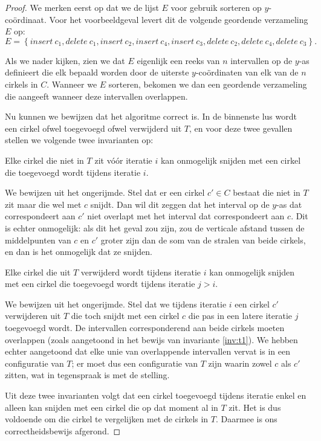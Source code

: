 \begin{proof}
We merken eerst op dat we de lijst $E$ voor gebruik sorteren op
$y$-co\"ordinaat. Voor het voorbeeldgeval levert dit de volgende
geordende verzameling $E$ op: \[E = \left\{insert\ c_1, delete\ c_1,
insert\ c_2, insert\ c_4, insert\ c_3, delete\ c_2, delete\ c_4,
delete\ c_3 \right\}.\]

Als we nader kijken, zien we dat $E$ eigenlijk een reeks van $n$
intervallen op de $y$-as definieert die elk bepaald worden door de
uiterste $y$-co\"ordinaten van elk van de $n$ cirkels in $C$. Wanneer
we $E$ sorteren, bekomen we dan een geordende verzameling die aangeeft
wanneer deze intervallen overlappen.

Nu kunnen we bewijzen dat het algoritme correct is. In de binnenste
lus wordt een cirkel ofwel toegevoegd ofwel verwijderd uit $T$, en
voor deze twee gevallen stellen we volgende twee invarianten op:

\begin{inv}
Elke cirkel die niet in $T$ zit v\'o\'or iteratie $i$ kan onmogelijk
snijden met een cirkel die toegevoegd wordt tijdens iteratie $i$.
\label{inv:t1}
\end{inv}

We bewijzen uit het ongerijmde. Stel dat er een cirkel $c' \in C$
bestaat die niet in $T$ zit maar die wel met $c$ snijdt. Dan wil dit
zeggen dat het interval op de $y$-as dat correspondeert aan $c'$ niet
overlapt met het interval dat correspondeert aan $c$. Dit is echter
onmogelijk: als dit het geval zou zijn, zou de verticale afstand
tussen de middelpunten van $c$ en $c'$ groter zijn dan de som van de
stralen van beide cirkels, en dan is het onmogelijk dat ze snijden.

\begin{inv}
Elke cirkel die uit $T$ verwijderd wordt tijdens iteratie $i$ kan onmogelijk
snijden met een cirkel die toegevoegd wordt tijdens iteratie $j > i$.
\label{inv:t2}
\end{inv}

We bewijzen uit het ongerijmde. Stel dat we tijdens iteratie $i$ een
cirkel $c'$ verwijderen uit $T$ die toch snijdt met een cirkel $c$ die
pas in een latere iteratie $j$ toegevoegd wordt. De intervallen
corresponderend aan beide cirkels moeten overlappen (zoals aangetoond
in het bewijs van invariante \ref{inv:t1}). We hebben echter
aangetoond dat elke unie van overlappende intervallen vervat is in een
configuratie van $T$; er moet dus een configuratie van $T$ zijn waarin
zowel $c$ als $c'$ zitten, wat in tegenspraak is met de stelling.

Uit deze twee invarianten volgt dat een cirkel toegevoegd tijdens
iteratie enkel en alleen kan snijden met een cirkel die op dat moment
al in $T$ zit. Het is dus voldoende om die cirkel te vergelijken met
de cirkels in $T$. Daarmee is ons correctheidsbewijs afgerond.
\end{proof}
